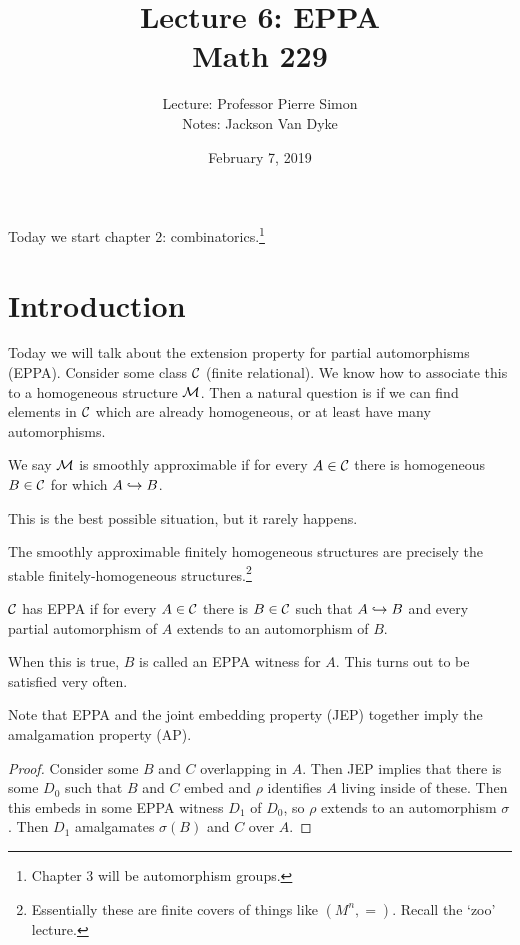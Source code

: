\documentclass{amsart}
\begin{document}
\title{Lecture 6: EPPA\\Math 229}
\date{February 7, 2019}
\author{Lecture: Professor Pierre Simon\\Notes: Jackson Van Dyke}
\maketitle

Today we start chapter 2: combinatorics.\footnote{
Chapter 3 will be automorphism groups.}

\section{Introduction}

Today we will talk about the extension property for partial automorphisms (EPPA).
Consider some \Fraisse class $\mathcal{C}$ (finite relational).
We know how to associate this to a homogeneous structure $\mathcal{M}$. 
Then a natural question is if we can find elements in $\mathcal{C}$ which are already homogeneous,
or at least have many automorphisms.

\begin{defn}
We say $\mathcal{M}$ is smoothly approximable if for every $A\in \mathcal{C}$ there is homogeneous $B\in \mathcal{C}$ for
which $A\hookrightarrow B$.
\end{defn}

This is the best possible situation, but it rarely happens.

\begin{thm}
The smoothly approximable finitely homogeneous structures are precisely the
stable finitely-homogeneous structures.\footnote{Essentially these are finite covers of
things like $\left( M^n, = \right)$. Recall the `zoo' lecture.}
\end{thm}

\begin{defn}
$\mathcal{C}$ has EPPA if for every $A\in \mathcal{C}$ there is $B\in \mathcal{C}$ such that $A\hookrightarrow B$ and every
partial automorphism of $A$ extends to an automorphism of $B$.
\end{defn}

When this is true, $B$ is called an EPPA witness for $A$.
This turns out to be satisfied very often.

\begin{rmk}
Note that EPPA and the joint embedding property (JEP) together imply the amalgamation property (AP).
\end{rmk}

\begin{proof}
Consider some $B$ and $C$ overlapping in $A$. Then JEP implies that there is some $D_0$
such that $B$ and $C$ embed 
and $\rho$ identifies $A$ living inside of these. 
Then this embeds in some EPPA witness $D_1$ of $D_0$, 
so $\rho$ extends to an automorphism $\sigma$.
Then $D_1$ amalgamates $\sigma\left( B \right)$ and $C$ over $A$.
\end{proof}
\end{document}
